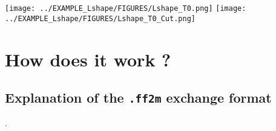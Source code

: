 \begin{figure*}[t]
\small

 \normalsize
\caption{
FreeFem++ program {\texttt Lshape\_Mesh.edp})}
\label{Lshape_Mesh.edp}
\end{figure*}

\begin{figure*}[t]
\small

\normalsize
\caption{
FreeFem++ program {\texttt Lshape\_Steady.edf})}
\label{Lshape_Mesh.edp}
\end{figure*}

\begin{figure*}[t]
\texttt{[image: ../EXAMPLE\_Lshape/FIGURES/Lshape\_T0.png]}
\texttt{[image: ../EXAMPLE\_Lshape/FIGURES/Lshape\_T0\_Cut.png]}
\caption{Solution for the steady hrat equation in a L-shape domain : $(a)$ Temperature field $T(x,y)$. 
$(b)$ Temperature $T(x,0.25)$ along a horizontal line. }
\label{Lshape_Mesh.edp}
\end{figure*}


\section{How does it work ?}


\subsection{Explanation of the \texttt{.ff2m} exchange format}.




